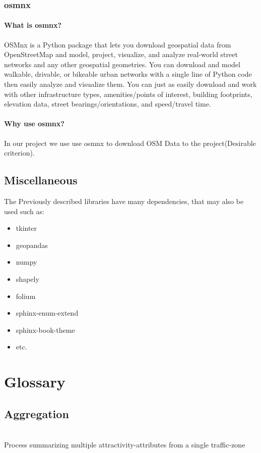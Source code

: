 \documentclass[parskip=full]{scrartcl} %
\begin{document}
\subsubsection{osmnx}

\paragraph{What is osmnx?}
OSMnx is a Python package that lets you download geospatial data from OpenStreetMap and model, project, visualize, and analyze real-world street networks and any other geospatial geometries. You can download and model walkable, drivable, or bikeable urban networks with a single line of Python code then easily analyze and visualize them. You can just as easily download and work with other infrastructure types, amenities/points of interest, building footprints, elevation data, street bearings/orientations, and speed/travel time.

\paragraph{Why use osmnx?}
In our project we use use osmnx to download OSM Data to the project(Desirable criterion).

\subsection{Miscellaneous}
The Previously described libraries have many dependencies, that may also be used such as:
\begin{itemize}
    \item tkinter
    \item geopandas
    \item numpy
    \item shapely
    \item folium
    \item sphinx-enum-extend
    \item sphinx-book-theme 
    \item etc.
\end{itemize}



\newpage

\section{Glossary}

\subsection{Aggregation}\\
Process summarizing multiple attractivity-attributes from a single traffic-zone
\end{document}
